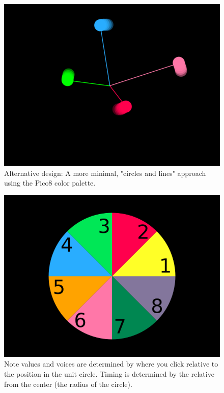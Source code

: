 \documentclass[11pt, twocolumn]{article}
\begin{document}
\begin{figure}[p]
\centering
\includegraphics[width=\linewidth]{lines_and_circles}
\caption{Alternative design: A more minimal, "circles and lines" approach using 
the Pico8 color palette.}
\label{fig:lines_and_circles}
\end{figure}

\begin{figure}[p]
\centering
\includegraphics[width=\linewidth]{scale_positions}
\caption{Note values and voices are determined by where you click relative 
to the position in the unit circle. Timing is determined by the relative from the center
(the radius of the circle). }
\label{fig:scales} \end{figure} 
\end{document}
